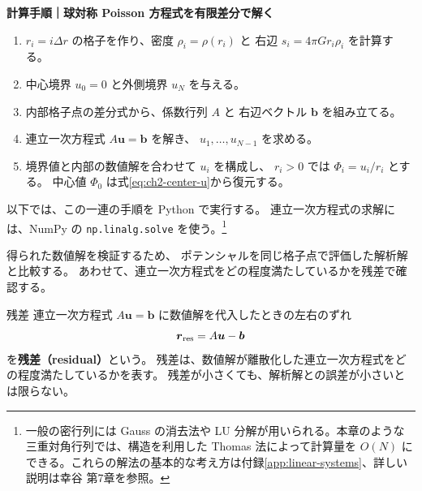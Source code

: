 \medskip
\noindent\textbf{計算手順｜球対称 Poisson 方程式を有限差分で解く}
\par\smallskip
\begin{enumerate}[itemsep=0em,topsep=0.1em]
 \item $r_i=i\Delta r$ の格子を作り、密度 $\rho_i=\rho(r_i)$ と
       右辺 $s_i=4\pi G r_i\rho_i$ を計算する。
 \item 中心境界 $u_0=0$ と外側境界 $u_N$ を与える。
 \item 内部格子点の差分式から、係数行列 $A$ と
       右辺ベクトル $\boldsymbol{b}$ を組み立てる。
 \item 連立一次方程式 $A\boldsymbol{u}=\boldsymbol{b}$ を解き、
       $u_1,\ldots,u_{N-1}$ を求める。
 \item 境界値と内部の数値解を合わせて $u_i$ を構成し、
       $r_i>0$ では $\Phi_i=u_i/r_i$ とする。
       中心値 $\Phi_0$ は式\eqref{eq:ch2-center-u}から復元する。
\end{enumerate}
\medskip

以下では、この一連の手順を Python で実行する。
連立一次方程式の求解には、NumPy の \texttt{np.linalg.solve} を使う。\footnote{一般の密行列には Gauss の消去法や LU 分解が用いられる。本章のような三重対角行列では、構造を利用した Thomas 法によって計算量を $O(N)$ にできる。これらの解法の基本的な考え方は付録\ref{app:linear-systems}、詳しい説明は幸谷 第7章\cite{kouya2021}を参照。}

得られた数値解を検証するため、
ポテンシャルを同じ格子点で評価した解析解と比較する。
あわせて、連立一次方程式をどの程度満たしているかを残差で確認する。

\begin{definitionbox}{残差}
連立一次方程式 $A\boldsymbol{u}=\boldsymbol{b}$ に数値解を代入したときの左右のずれ
\begin{equation}
 \boldsymbol{r}_{\rm res}
 =A\boldsymbol{u}-\boldsymbol{b}
\label{eq:ch2-residual}
\end{equation}
を\textbf{残差（residual）}という。
残差は、数値解が離散化した連立一次方程式をどの程度満たしているかを表す。
残差が小さくても、解析解との誤差が小さいとは限らない。
\end{definitionbox}

